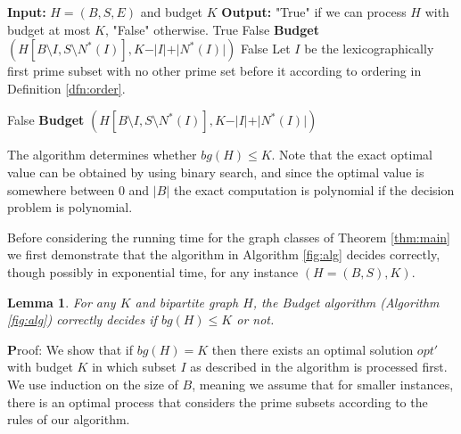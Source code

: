 \documentclass[letterpaper,11pt,abstracton]{scrartcl}
\newcommand{\pf}{{\textbf Proof: }}
\newtheorem{lemma}[theorem]{Lemma}
\begin{document}
\begin{algorithm}[H]
\begin{algorithmic}[1]
\State \textbf{Input:} $H=(B,S,E)$ and budget $K$\;
\State \textbf{Output:} "True" if we can process $H$ with budget at most $K$, "False" otherwise.\;
\label{Alg-general-firstIF}
 \Return True\;
\EndIf \label{Alg-gnr-end-firstif}
 \label{Alg-general-secondIF}
\Return False\;
\EndIf \label{Alg-gnr-end-secondif}
 \label{Alg-general-thirdIF}
     \Return \textbf{Budget} $(H[B \setminus I,S \setminus N^{*}(I)],
K-\vert I\vert +\vert N^{*}(I)\vert)$\;
\EndIf \label{Alg-gnr-end-thirdif}
  \label{Alg-general-fourthIF}
\Return False\;
\EndIf \label{Alg-gnr-end-fourthif}
\State Let $I$ be the lexicographically first prime subset with no other prime set before it according to ordering in Definition \ref{dfn:order}.

 \label{Alg-general-fifthIF}
    \Return False
\Else {}
     \Return \textbf{Budget} $(H[B \setminus I,S \setminus N^{*}(I)], K-\vert I \vert +\vert N^{*}(I)\vert)$\;
\EndIf \label{Alg-gnr-end-fifthif}
\end{algorithmic}
\caption{{\textbf Budget } ( $H=(B,S,E)$, $K$)}
\label{fig:alg}
\end{algorithm}

The algorithm determines whether $bg(H) \leq K$. Note that the exact
optimal value can be obtained by using binary search, and since the
optimal value is somewhere between 0 and $|B|$ the exact computation
is polynomial if the decision problem is polynomial.

Before considering the running time for the graph classes of Theorem \ref{thm:main} we
first demonstrate that the algorithm in Algorithm \ref{fig:alg} decides correctly,
though possibly in exponential time, for any instance $( H = (B, S), K)$.

\begin{lemma}\label{lm:optimal}
  For any $K$ and bipartite graph $H$, the Budget algorithm  (Algorithm \ref{fig:alg}) correctly
  decides if $bg(H) \leq K$ or not.
\end{lemma}
\pf We show that if $bg(H)=K$ then there exists an optimal solution $opt'$ with
budget $K$ in which subset $I$ as described in the algorithm is processed
first. We use induction on the size of $B$, meaning we assume that for smaller instances,
there is an optimal process that considers the prime subsets according to the rules of our algorithm.
\end{document}
